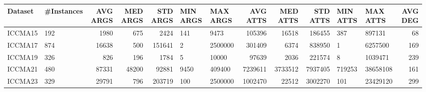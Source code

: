\begin{tabular}{llrrrllrrrllr}
\toprule
Dataset & #Instances & AVG ARGS & MED ARGS & STD ARGS & MIN ARGS & MAX ARGS & AVG ATTS & MED ATTS & STD ATTS & MIN ATTS & MAX ATTS & AVG DEG \\
\midrule
ICCMA15 & 192 & 1980 & 675 & 2424 & 141 & 9473 & 105396 & 16518 & 186455 & 387 & 897131 & 68 \\
ICCMA17 & 874 & 16638 & 500 & 151641 & 2 & 2500000 & 301409 & 6374 & 838950 & 1 & 6257500 & 169 \\
ICCMA19 & 326 & 826 & 196 & 1784 & 5 & 10000 & 97639 & 2036 & 221574 & 8 & 1039471 & 239 \\
ICCMA21 & 480 & 87331 & 48200 & 92881 & 9450 & 409400 & 7239611 & 3733512 & 7937405 & 719253 & 38658108 & 161 \\
ICCMA23 & 329 & 29791 & 796 & 203719 & 100 & 2500000 & 1002470 & 22512 & 3002270 & 101 & 23429120 & 299 \\
\bottomrule
\end{tabular}
